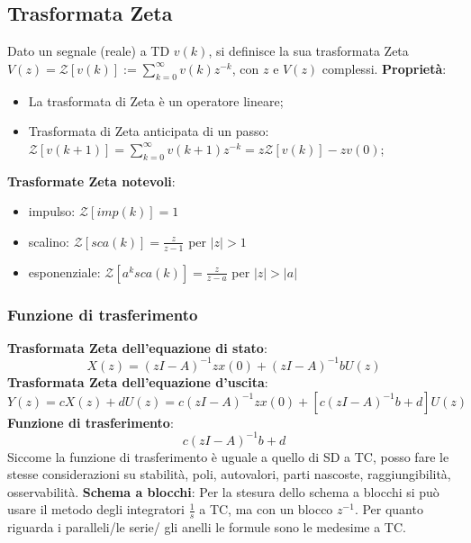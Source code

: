 \begin{landscape}
\begin{multicols*}{2}
    \subsection{Trasformata Zeta}
    Dato un segnale (reale) a TD $v(k)$, si definisce la sua trasformata Zeta $V(z) = \mathcal{Z}[v(k)] := \sum_{k=0}^{\infty} v(k) z^{-k}$, con $z$ e $V(z)$ complessi.\newline
    \textbf{Proprietà}:
    \begin{itemize}
        \item La trasformata di Zeta è un operatore lineare;
        \item Trasformata di Zeta anticipata di un passo: $\mathcal{Z}[v(k+1)] = \sum_{k=0}^{\infty} v(k+1) z^{-k} = z \mathcal{Z}[v(k)] - z v(0)$;
    \end{itemize}
    \textbf{Trasformate Zeta notevoli}:
    \begin{itemize}
        \item impulso: $\mathcal{Z}[imp(k)] = 1$
        \item scalino: $\mathcal{Z}[sca(k)] = \frac{z}{z-1}$ per $|z|>1$
        \item esponenziale: $\mathcal{Z}[a^k sca(k)] = \frac{z}{z-a}$ per $|z| > |a|$
    \end{itemize}
    \subsubsection{Funzione di trasferimento}
    \textbf{Trasformata Zeta dell'equazione di stato}:
    \[
        X(z) = (zI-A)^{-1} z x(0) + (zI-A)^{-1} b U(z)
    \]
    \textbf{Trasformata Zeta dell'equazione d'uscita}:
    \[
        Y(z) = cX(z) + dU(z) = c(zI-A)^{-1} z x(0) + [c(zI-A)^{-1} b + d] U(z)
    \]
    \textbf{Funzione di trasferimento}:
    \[
        c(zI-A)^{-1} b + d
    \]
    Siccome la funzione di trasferimento è uguale a quello di SD a TC, posso fare le stesse considerazioni su stabilità, poli, autovalori, parti nascoste, raggiungibilità, osservabilità.\newline
    \newline
    \textbf{Schema a blocchi}:\newline
    Per la stesura dello schema a blocchi si può usare il metodo degli integratori $\frac{1}{s}$ a TC, ma con un blocco $z^{-1}$.\newline
    Per quanto riguarda i paralleli/le serie/ gli anelli le formule sono le medesime a TC. 

\end{multicols*}
\end{landscape}
